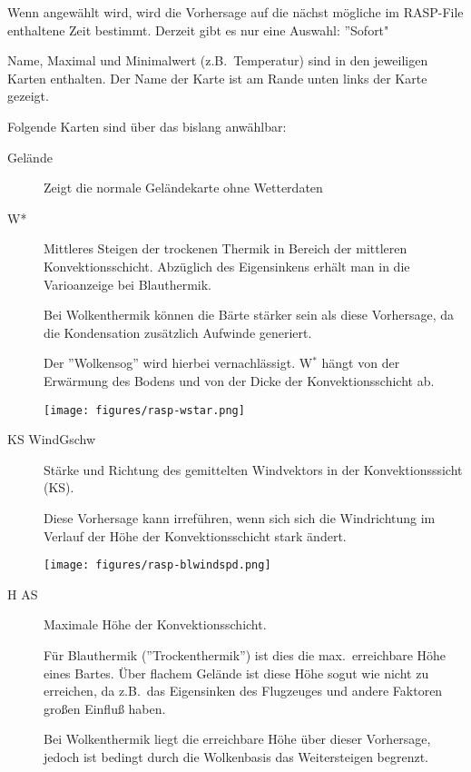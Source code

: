  Wenn   angewählt wird, wird die Vorhersage auf die nächst mögliche im RASP-File
enthaltene Zeit bestimmt.  Derzeit gibt es nur eine Auswahl: ''Sofort"

Name, Maximal und Minimalwert (z.B.\ Temperatur) sind in den jeweiligen Karten enthalten.
Der Name der Karte ist am Rande unten links der Karte gezeigt.

Folgende Karten sind über das   bislang anwählbar:
\begin{description}
\item[Gelände] Zeigt die normale Geländekarte ohne Wetterdaten
\item[W*]
Mittleres Steigen  der trockenen Thermik in Bereich der mittleren Konvektionsschicht.
Abzüglich des Eigensinkens erhält man in die Varioanzeige  bei Blauthermik.

Bei Wolkenthermik können die Bärte stärker sein als diese Vorhersage,  da die
Kondensation zusätzlich Aufwinde generiert.

Der ''Wolkensog''  wird hierbei vernachlässigt.
W$^\ast$ hängt von der Erwärmung des Bodens  und von der Dicke der Konvektionsschicht ab.

\begin{center}
\texttt{[image: figures/rasp-wstar.png]}
\end{center}

\item[KS WindGschw]
Stärke und Richtung des gemittelten Windvektors  in der Konvektionsssicht (KS).

Diese Vorhersage kann irreführen, wenn sich sich die Windrichtung im Verlauf der
Höhe der Konvektionsschicht stark ändert.

\begin{center}
\texttt{[image: figures/rasp-blwindspd.png]}
\end{center}

\item[H AS]
Maximale Höhe der Konvektionsschicht.

Für Blauthermik (''Trockenthermik'') ist dies die max.\ erreichbare Höhe eines Bartes.
Über flachem Gelände ist diese Höhe sogut wie nicht zu erreichen, da z.B.\ das
Eigensinken des Flugzeuges und andere Faktoren großen Einfluß haben.

Bei Wolkenthermik liegt die erreichbare Höhe über dieser Vorhersage, jedoch ist
bedingt durch die Wolkenbasis das Weitersteigen begrenzt.


\end{description}
